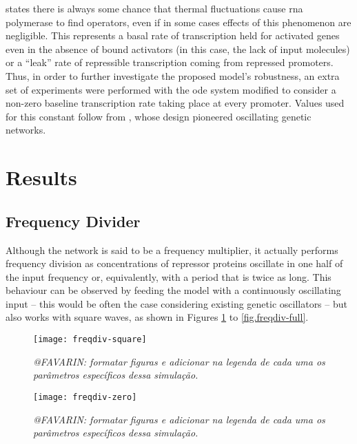  \citet{ingalls} states there is always some chance that thermal fluctuations cause \acs{rna} polymerase to find operators, even if in some cases effects of this phenomenon are negligible.
  This represents a basal rate of transcription held for activated genes even in the absence of bound activators (in this case, the lack of input molecules) or a ``leak'' rate of repressible transcription coming from repressed promoters.
  Thus, in order to further investigate the proposed model's robustness, an extra set of experiments were performed with the \ac{ode} system modified to consider a non-zero baseline transcription rate taking place at every promoter.
  Values used for this constant follow from \citet{repressilator}, whose design pioneered oscillating genetic networks.


\section{Results}

  \subsection{Frequency Divider}

    Although the network is said to be a frequency multiplier, it actually performs frequency division as concentrations of repressor proteins oscillate in one half of the input frequency or, equivalently, with a period that is twice as long.
    This behaviour can be observed by feeding the model with a continuously oscillating input -- this would be often the case considering existing genetic oscillators -- but also works with square waves, as shown in Figures \ref{fig.freqdiv-square} to \ref{fig.freqdiv-full}.

    \begin{figure}[!htbp]
      \centering
      \texttt{[image: freqdiv-square]}
      \caption{\textit{@FAVARIN: formatar figuras e adicionar na legenda de cada uma os parâmetros específicos dessa simulação.}}
      \label{fig.freqdiv-square}
    \end{figure}

    \begin{figure}[!htbp]
      \centering
      \texttt{[image: freqdiv-zero]}
      \caption{\textit{@FAVARIN: formatar figuras e adicionar na legenda de cada uma os parâmetros específicos dessa simulação.}}
      \label{fig.freqdiv-zero}
    \end{figure}

